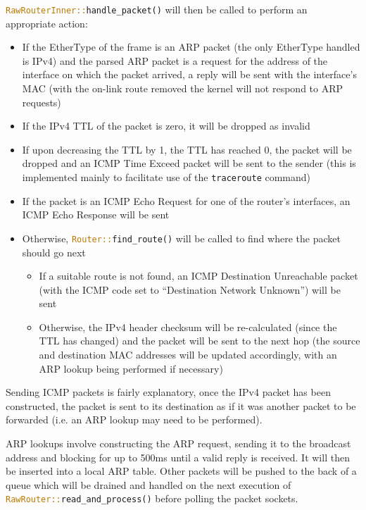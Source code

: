 \documentclass[a4paper]{article}
\numberwithin{figure}{section}
\numberwithin{table}{section}
\newcommand{\mi}{\mintinline}
\begin{document}
\mi{rust}{RawRouterInner::handle_packet()} will then be called to perform an appropriate action:
\begin{itemize}
	\item If the EtherType of the frame is an ARP packet (the only EtherType handled is IPv4) and the parsed ARP packet is a request for the address of the interface on which the packet arrived, a reply will be sent with the interface's MAC (with the on-link route removed the kernel will not respond to ARP requests)
	\item If the IPv4 TTL of the packet is zero, it will be dropped as invalid
	\item If upon decreasing the TTL by 1, the TTL has reached 0, the packet will be dropped and an ICMP Time Exceed packet will be sent to the sender (this is implemented mainly to facilitate use of the \mi{c}{traceroute} command)
	\item If the packet is an ICMP Echo Request for one of the router's interfaces, an ICMP Echo Response will be sent
	\item Otherwise, \mi{rust}{Router::find_route()} will be called to find where the packet should go next
		\begin{itemize}
			\item If a suitable route is not found, an ICMP Destination Unreachable packet (with the ICMP code set to ``Destination Network Unknown'') will be sent
			\item Otherwise, the IPv4 header checksum will be re-calculated (since the TTL has changed) and the packet will be sent to the next hop (the source and destination MAC addresses will be updated accordingly, with an ARP lookup being performed if necessary)
		\end{itemize}
\end{itemize}

Sending ICMP packets is fairly explanatory, once the IPv4 packet has been constructed, the packet is sent to its destination as if it was another packet to be forwarded (i.e. an ARP lookup may need to be performed).

ARP lookups involve constructing the ARP request, sending it to the broadcast address and blocking for up to 500ms until a valid reply is received. It will then be inserted into a local ARP table. Other packets will be pushed to the back of a queue which will be drained and handled on the next execution of \mi{rust}{RawRouter::read_and_process()} before polling the packet sockets.
\end{document}
